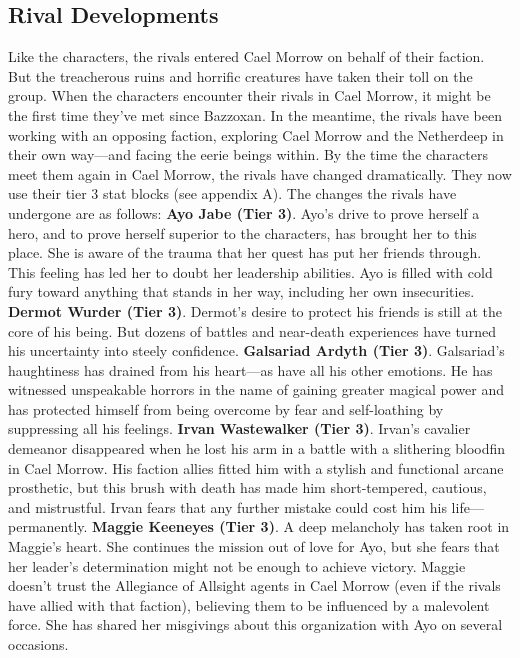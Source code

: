 \documentclass[10pt,a4,twoside,twocolumn,openany,nodeprecatedcode]{dndbook}
\begin{document}
\subsection{Rival Developments}
Like the characters, the rivals entered Cael Morrow on behalf of their faction. But the treacherous ruins and horrific creatures have taken their toll on the group.
When the characters encounter their rivals in Cael Morrow, it might be the first time they've met since Bazzoxan. In the meantime, the rivals have been working with an opposing faction, exploring Cael Morrow and the Netherdeep in their own way—and facing the eerie beings within.
By the time the characters meet them again in Cael Morrow, the rivals have changed dramatically. They now use their tier 3 stat blocks (see appendix A). The changes the rivals have undergone are as follows:
\textbf{Ayo Jabe (Tier 3)}. Ayo's drive to prove herself a hero, and to prove herself superior to the characters, has brought her to this place. She is aware of the trauma that her quest has put her friends through. This feeling has led her to doubt her leadership abilities. Ayo is filled with cold fury toward anything that stands in her way, including her own insecurities.
\textbf{Dermot Wurder (Tier 3)}. Dermot's desire to protect his friends is still at the core of his being. But dozens of battles and near-death experiences have turned his uncertainty into steely confidence.
\textbf{Galsariad Ardyth (Tier 3)}. Galsariad's haughtiness has drained from his heart—as have all his other emotions. He has witnessed unspeakable horrors in the name of gaining greater magical power and has protected himself from being overcome by fear and self-loathing by suppressing all his feelings.
\textbf{Irvan Wastewalker (Tier 3)}. Irvan's cavalier demeanor disappeared when he lost his arm in a battle with a slithering bloodfin in Cael Morrow. His faction allies fitted him with a stylish and functional arcane prosthetic, but this brush with death has made him short-tempered, cautious, and mistrustful. Irvan fears that any further mistake could cost him his life—permanently.
\textbf{Maggie Keeneyes (Tier 3)}. A deep melancholy has taken root in Maggie's heart. She continues the mission out of love for Ayo, but she fears that her leader's determination might not be enough to achieve victory. Maggie doesn't trust the Allegiance of Allsight agents in Cael Morrow (even if the rivals have allied with that faction), believing them to be influenced by a malevolent force. She has shared her misgivings about this organization with Ayo on several occasions.
\end{document}
